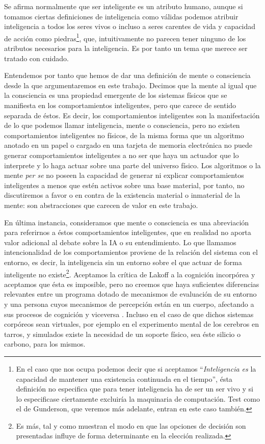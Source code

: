 \documentclass[12pt]{memoir}
\begin{document}
Se afirma normalmente que ser inteligente es un atributo humano, aunque si tomamos ciertas definiciones de inteligencia como válidas podemos atribuir inteligencia a todos los seres vivos o incluso a seres carentes de vida y capacidad de acción como piedras\footnote{En el caso que nos ocupa podemos decir que si aceptamos ``\textit{Inteligencia es} la capacidad de mantener una existencia continuada en el tiempo'', ésta definición no especifica que para tener inteligencia ha de ser un ser vivo y si lo especificase ciertamente excluiría la maquinaria de computación. Test como el de Gunderson, que veremos más adelante, entran en este caso también.}, que, intuitivamente no parecen tener ninguno de los atributos necesarios para la inteligencia. Es por tanto un tema que merece ser tratado con cuidado.

Entendemos por tanto que hemos de dar una definición de mente o consciencia desde la que argumentaremos en este trabajo. Decimos que la mente al igual que la consciencia es una propiedad emergente de los sistemas físicos que se manifiesta en los comportamientos inteligentes, pero que carece de sentido separada de éstos. Es decir, los comportamientos inteligentes son la manifestación de lo que podemos llamar inteligencia, mente o consciencia, pero no existen comportamientos inteligentes no físicos, de la misma forma que un algoritmo anotado en un papel o cargado en una tarjeta de memoria electrónica no puede generar comportamientos inteligentes a no ser que haya un actuador que lo interprete y lo haga actuar sobre una parte del universo físico. Los algoritmos o la mente \textit{per se} no poseen la capacidad de generar ni explicar comportamientos inteligentes a menos que estén activos sobre una base material, por tanto, no discutiremos a favor o en contra de la existencia material o inmaterial de la mente: son abstracciones que carecen de valor en este trabajo.

\nocite{newmind}

En última instancia, consideramos que mente o consciencia es una abreviación para referirnos a éstos comportamientos inteligentes, que en realidad no aporta valor adicional al debate sobre la IA o su entendimiento. Lo que llamamos intencionalidad de los comportamientos proviene de la relación del sistema con el entorno, es decir, la inteligencia sin un entorno sobre el que actuar de forma inteligente no existe\footnote{Es más, tal y como muestran \parencite{framingKahnemanTversky} el modo en que las opciones de decisión son presentadas influye de forma determinante en la elección realizada.}. Aceptamos la crítica de Lakoff a la cognición incorpórea y aceptamos que ésta es imposible, pero no creemos que haya suficientes diferencias relevantes entre un programa dotado de mecanismos de evaluación de su entorno y una persona cuyos mecanismos de percepción están en un cuerpo, afectando a sus procesos de cognición y viceversa \parencite{lakoff, lakoffEmbodiedCognition}. Incluso en el caso de que dichos sistemas corpóreos sean virtuales, por ejemplo en el experimento mental de los cerebros en tarros, y simulados existe la necesidad de un soporte físico, sea éste silicio o carbono, para los mismos.
\end{document}
